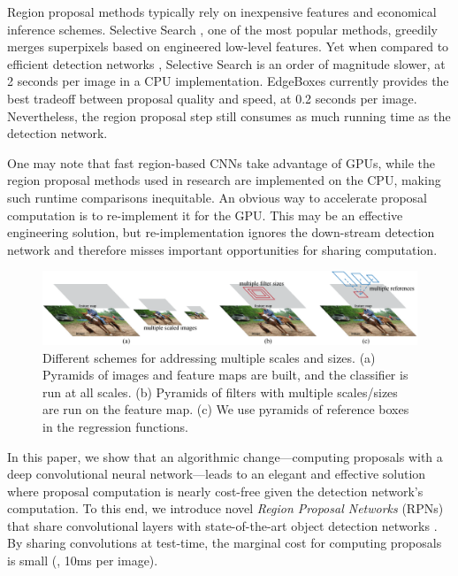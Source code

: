 \documentclass[10pt,journal,cspaper,compsoc]{IEEEtran}
\begin{document}
Region proposal methods typically rely on inexpensive features and economical inference schemes.
Selective Search \cite{Uijlings2013}, one of the most popular methods, greedily merges superpixels based on engineered low-level features. Yet when compared to efficient detection networks \cite{Girshick2015a}, Selective Search is an order of magnitude slower, at 2 seconds per image in a CPU implementation.
EdgeBoxes \cite{Zitnick2014} currently provides the best tradeoff between proposal quality and speed, at 0.2 seconds per image. Nevertheless, the region proposal step still consumes as much running time as the detection network.

One may note that fast region-based CNNs take advantage of GPUs, while the region proposal methods used in research are implemented on the CPU, making such runtime comparisons inequitable. An obvious way to accelerate proposal computation is to re-implement it for the GPU. This may be an effective engineering solution, but re-implementation ignores the down-stream detection network and therefore misses important opportunities for sharing computation.

\begin{figure}[t]
\centering
\includegraphics[width=1.0\linewidth]{eps/pyramids}
\caption{Different schemes for addressing multiple scales and sizes. (a) Pyramids of images and feature maps are built, and the classifier is run at all scales. (b) Pyramids of filters with multiple scales/sizes are run on the feature map. (c) We use pyramids of reference boxes in the regression functions.}
\label{fig:pyramids}
\end{figure}

In this paper, we show that an algorithmic change---computing proposals with a deep convolutional neural network---leads to an elegant and effective solution where proposal computation is nearly cost-free given the detection network's computation.
To this end, we introduce novel \emph{Region Proposal Networks} (RPNs) that share convolutional layers with state-of-the-art object detection networks \cite{He2014,Girshick2015a}. By sharing convolutions at test-time, the marginal cost for computing proposals is small (\eg, 10ms per image).
\end{document}
